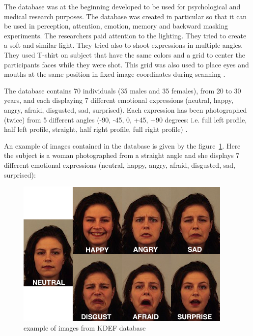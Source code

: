 \noindent The database was at the beginning developed to be used for psychological and medical research purposes. The database was created in particular so that it can be used in perception, attention, emotion, memory and backward masking experiments. The researchers paid attention to the lighting. They tried to create a soft and similar light. They tried also to shoot expressions in multiple angles. They used T-shirt on subject that have the same colors and a grid to center the participants faces while they were shot. This grid was also used to place eyes and mouths at the same position in fixed image coordinates during scanning \cite{KDEF}.
\newline

\noindent The database contains 70 individuals (35 males and 35 females), from 20 to 30 years,  and each displaying 7 different emotional expressions (neutral, happy, angry, afraid, disgusted, sad, surprised). Each expression has been photographed (twice) from 5 different angles (-90, -45, 0, +45, +90 degrees: i.e. full left profile, half left profile, straight, half right profile, full right profile)  \cite{KDEF}.
\newline

\noindent An example of images contained in the database is given by the figure~\ref{kdef_7facialexpressions}. Here the subject is a woman photographed from a straight angle and she displays 7 different emotional expressions (neutral, happy, angry, afraid, disgusted, sad, surprised): 
\newline

\begin{figure}[!h]
\begin{center}
\noindent \includegraphics[scale=0.7]{figures/kdef_7facialexpressions} 
\newline
\caption{example of images from KDEF database}
\label{kdef_7facialexpressions}
\end{center} 
\end{figure}

